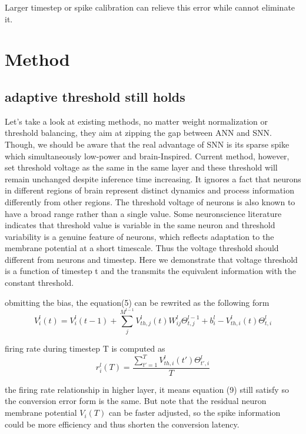 \documentclass{article}
\begin{document}
Larger timestep or spike calibration can relieve this error while cannot eliminate it. 

\section{Method}
\subsection{adaptive threshold still holds}
Let's take a look at existing methods, no matter weight normalization or threshold balancing, they aim at zipping the gap between ANN and SNN. Though, we should be aware that
the real advantage of SNN is its sparse spike which simultaneously low-power and brain-Inspired. Current method, however, set threshold voltage as the same in the same layer and 
these threshold will remain unchanged despite inference time increasing. It ignores a fact that neurons in different
regions of brain represent distinct dynamics and process information differently from other regions. 
The threshold voltage of neurons is also known to have a broad
range rather than a single value. Some neuronscience literature indicates that threshold value 
is variable in the same neuron and threshold 
variability is a genuine feature of neurons, which reflects 
adaptation to the membrane potential at a short 
timescale. Thus the voltage threshold should different from neurons and timestep. Here we demonstrate that voltage threshold is a function of timestep t and the transmits the equivalent information with the constant threshold.

obmitting the bias, the equation(5) can be rewrited as the following form
\begin{equation}
  V_i^l(t)=V_{i}^{l}(t-1)+\sum_j^{M^{l-1}}V_{th,j}^l(t)W_{ij}^l\Theta_{t,j}^{l-1}+b_i^l -V_{th,i}^l(t)\Theta_{t,i}^{l}
\end{equation}

firing rate during timestep T is computed as 
\begin{equation}
  r_i^l(T) = \frac{\sum_{t'=1}^{T}V_{th,i}^l(t')\Theta_{t',i}^{l}}{T}
\end{equation}

the firing rate relationship in higher layer, it means equation (9) still satisfy so the conversion error form is the same.
But note that the residual neuron membrane potential $V_i(T)$ can be faster adjusted, so the spike information could be more efficiency and thus shorten the conversion latency. 
\end{document}
